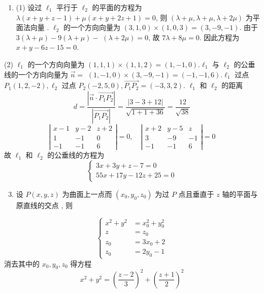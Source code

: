 \documentclass[10pt]{article}
\begin{document}
\begin{enumerate}
  \item (1)  设过  $\ell_{1}$  平行于  $\ell_{2}$  的平面的方程为  $\lambda(x+y+z-1)+\mu(x+y+2 z+1)=0$,  则  $(\lambda+\mu, \lambda+\mu, \lambda+2 \mu)$  为平面法向量 . $\ell_{2}$  的一个方向向量为  $(3,1,0) \times(1,0,3)=(3,-9,-1)$.  由于  $3(\lambda+\mu)-9(\lambda+\mu)-$ $(\lambda+2 \mu)=0$,  故  $7 \lambda+8 \mu=0$.  因此方程为  $x+y-6 z-15=0$.
\end{enumerate}
(2) $\ell_{1}$  的一个方向向量为  $(1,1,1) \times(1,1,2)=(1,-1,0) . \ell_{1}$  与  $\ell_{2}$  的公垂线的一个方向向量为  $\vec{n}=$ $(1,-1,0) \times(3,-9,-1)=(-1,-1,6) . \ell_{1}$  过点  $P_{1}(1,2,-2), \ell_{2}$  过点  $P_{2}(-2,5,0), \overrightarrow{P_{1} P_{2}}=(-3,3,2)$. $\ell_{1}$  和  $\ell_{2}$  的距离 
$$
d=\frac{\left|\vec{n} \cdot \overrightarrow{P_{1} P_{2}}\right|}{\left|\overrightarrow{P_{1} P_{2}}\right|}=\frac{|3-3+12|}{\sqrt{1+1+36}}=\frac{12}{\sqrt{38}}
$$
$$
\left|\begin{array}{ccc}
x-1 & y-2 & z+2 \\
1 & -1 & 0 \\
-1 & -1 & 6
\end{array}\right|=0, \quad\left|\begin{array}{ccc}
x+2 & y-5 & z \\
3 & -9 & -1 \\
-1 & -1 & 6
\end{array}\right|=0
$$
 故  $\ell_{1}$  和  $\ell_{2}$  的公垂线的方程为 
$$
\left\{\begin{array}{r}
3 x+3 y+z-7=0 \\
55 x+17 y-12 z+25=0
\end{array}\right.
$$

\begin{enumerate}
  \setcounter{enumi}{2}
  \item  设  $P(x, y, z)$  为曲面上一点而  $\left(x_{0}, y_{0}, z_{0}\right)$  为过  $P$  点且垂直于  $z$  轴的平面与原直线的交点 ,  则 
\end{enumerate}
$$
\left\{\begin{aligned}
x^{2}+y^{2} &=x_{0}^{2}+y_{0}^{2} \\
z &=z_{0} \\
z_{0} &=3 x_{0}+2 \\
z_{0} &=2 y_{0}-1
\end{aligned}\right.
$$
 消去其中的  $x_{0}, y_{0}, z_{0}$  得方程 
$$
x^{2}+y^{2}=\left(\frac{z-2}{3}\right)^{2}+\left(\frac{z+1}{2}\right)^{2}
$$
\end{document}
